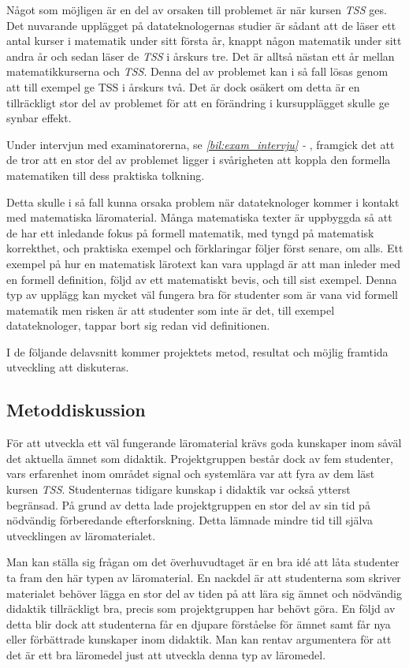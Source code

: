 \documentclass[12pt,a4paper,twoside,openright]{article}
\begin{document}
Något som möjligen är en del av orsaken till problemet är när kursen
\textit{TSS} ges. Det nuvarande upplägget på datateknologernas studier
är sådant att de läser ett antal kurser i matematik under sitt första
år, knappt någon matematik under sitt andra år och sedan läser de
\textit{TSS} i årskurs tre. Det är alltså nästan ett år mellan
matematikkurserna och \textit{TSS}. Denna del av problemet kan i så
fall lösas genom att till exempel ge TSS i årskurs två. Det är dock
osäkert om detta är en tillräckligt stor del av problemet för att en
förändring i kursupplägget skulle ge synbar effekt.

Under intervjun med examinatorerna, se \textit{\ref{bil:exam_intervju}
  - }, framgick det att de tror att en stor
del av problemet ligger i svårigheten att koppla den formella
matematiken till dess praktiska tolkning.

Detta skulle i så fall kunna orsaka problem när datateknologer kommer
i kontakt med matematiska läromaterial. Många matematiska texter är
uppbyggda så att de har ett inledande fokus på formell matematik, med
tyngd på matematisk korrekthet, och praktiska exempel och förklaringar
följer först senare, om alls. Ett exempel på hur en matematisk
lärotext kan vara upplagd är att man inleder med en formell
definition, följd av ett matematiskt bevis, och till sist
exempel. Denna typ av upplägg kan mycket väl fungera bra för studenter
som är vana vid formell matematik men risken är att studenter som inte
är det, till exempel datateknologer, tappar bort sig redan vid
definitionen.

I de följande delavsnitt kommer projektets metod, resultat och möjlig
framtida utveckling att diskuteras.

\subsection{Metoddiskussion}
\label{sec:metDisk}
För att utveckla ett väl fungerande läromaterial krävs goda kunskaper
inom såväl det aktuella ämnet som didaktik. Projektgruppen består dock
av fem studenter, vars erfarenhet inom området signal och systemlära
var att fyra av dem läst kursen \textit{TSS}. Studenternas tidigare
kunskap i didaktik var också ytterst begränsad. På grund av detta lade
projekt\-gruppen en stor del av sin tid på nödvändig förberedande
efterforskning. Detta lämnade mindre tid till själva utvecklingen av
läromaterialet.

Man kan ställa sig frågan om det överhuvudtaget är en bra idé att låta
studenter ta fram den här typen av läromaterial. En nackdel är att
studenterna som skriver materialet behöver lägga en stor del av tiden
på att lära sig ämnet och nödvändig didaktik tillräckligt bra, precis
som projektgruppen har behövt göra.  En följd av detta blir dock att
studenterna får en djupare förståelse för ämnet samt får nya eller
förbättrade kunskaper inom didaktik.  Man kan rentav argumentera för
att det är ett bra läromedel just att utveckla denna typ av läromedel.
\end{document}
